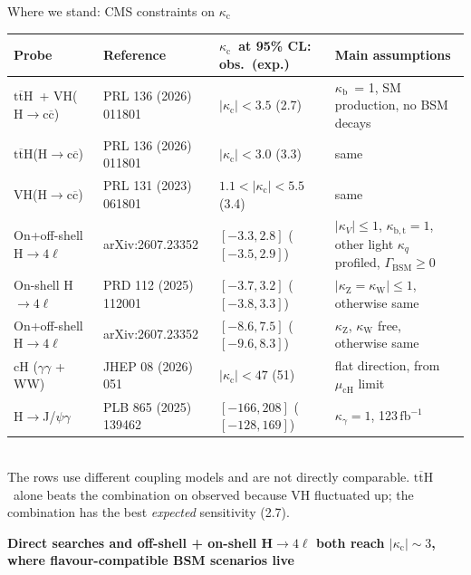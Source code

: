\documentclass[aspectratio=169,10pt,xcolor=table]{beamer}
\newcommand{\qbar}[1]{\mathrm{#1}\overline{\mathrm{#1}}}
\newcommand{\kc}{\ensuremath{\kappa_\mathrm{c}}}
\newcommand{\kb}{\ensuremath{\kappa_\mathrm{b}}}
\newcommand{\Hcc}{\ensuremath{\mathrm{H}\to\qbar{c}}}
\newcommand{\ttH}{\ensuremath{\qbar{t}\mathrm{H}}}
\newcommand{\fbinv}{\ensuremath{\,\mathrm{fb}^{-1}}}
\newcommand{\takeaway}[1]{\begin{center}\small\color{cmsblue}\textbf{#1}\end{center}}
\begin{document}
\begin{frame}{Where we stand: CMS constraints on \kc}
  \centering
  \footnotesize
  \setlength{\tabcolsep}{4pt}
  \renewcommand{\arraystretch}{1.2}
  \begin{tabular}{lll>{\raggedright\arraybackslash}p{3.9cm}}
    \toprule
    Probe & Reference & \kc\ at 95\% CL: obs.\ {\color{cmsgrey}(exp.)} & Main assumptions\\
    \midrule
    \rowcolor{cmslight}\ttH\ + VH(\Hcc) & PRL 136 (2026) 011801 & $|\kc| < 3.5$ {\color{cmsgrey}(2.7)} & \kb\ = 1, SM production, no BSM decays\\
    \ttH(\Hcc) & PRL 136 (2026) 011801 & $|\kc| < 3.0$ {\color{cmsgrey}(3.3)} & same\\
    VH(\Hcc) & PRL 131 (2023) 061801 & $1.1 < |\kc| < 5.5$ {\color{cmsgrey}(3.4)} & same\\
    \rowcolor{cmslight}On+off-shell H$\to4\ell$ & arXiv:2607.23352 & $[-3.3, 2.8]$ {\color{cmsgrey}($[-3.5,2.9]$)} & $|\kappa_V|\le1$, $\kappa_\mathrm{b,t}=1$, other light $\kappa_q$ profiled, $\Gamma_\mathrm{BSM}\ge0$\\
    On-shell H$\to4\ell$ & PRD 112 (2025) 112001 & $[-3.7, 3.2]$ {\color{cmsgrey}($[-3.8,3.3]$)} & $|\kappa_\mathrm{Z}=\kappa_\mathrm{W}|\le1$, otherwise same\\
    On+off-shell H$\to4\ell$ & arXiv:2607.23352 & $[-8.6, 7.5]$ {\color{cmsgrey}($[-9.6,8.3]$)} & $\kappa_\mathrm{Z}$, $\kappa_\mathrm{W}$ free, otherwise same\\
    cH ($\gamma\gamma$ + WW) & JHEP 08 (2026) 051 & $|\kc| < 47$ {\color{cmsgrey}(51)} & flat direction, from $\mu_\mathrm{cH}$ limit\\
    H$\to$J/$\psi\gamma$ & PLB 865 (2025) 139462 & $[-166, 208]$ {\color{cmsgrey}($[-128,169]$)} & $\kappa_\gamma = 1$, 123\fbinv\\
    \bottomrule
  \end{tabular}\\[0.5ex]
  {\scriptsize\color{cmsgrey}The rows use different coupling models and are not directly comparable. \ttH\ alone beats the combination on observed because VH fluctuated up; the combination has the best \emph{expected} sensitivity (2.7).}
  \vfill
  \takeaway{Direct searches and off-shell + on-shell H$\to4\ell$ both reach $|\kc|\sim3$, where flavour-compatible BSM scenarios live}
\end{frame}
\end{document}

